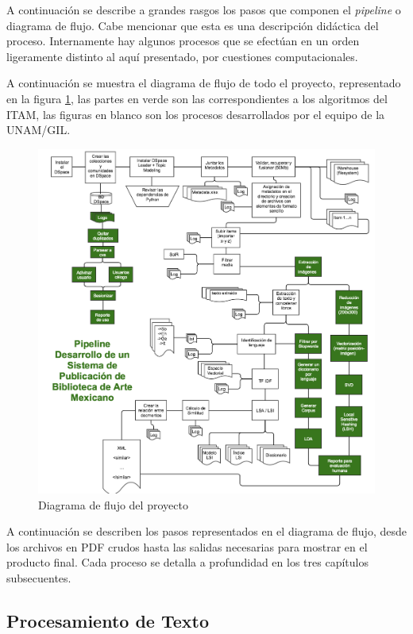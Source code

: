 A continuación se describe a grandes rasgos los pasos que componen el  \emph{pipeline} o diagrama de flujo. Cabe mencionar que esta es una descripción didáctica del proceso. Internamente hay algunos procesos que se efectúan en un orden ligeramente distinto al aquí presentado, por cuestiones computacionales.

 A continuación se muestra el diagrama de flujo de todo el proyecto, representado en la figura \ref{flujo}, las partes en verde son las correspondientes a los algoritmos  del ITAM, las figuras en blanco son los procesos desarrollados por el equipo de la UNAM/GIL.

\begin{figure}[H]
\centering
\includegraphics[width=1\textwidth]{Figures/pipeline.png}
\caption{Diagrama de flujo del proyecto}
\label{flujo}
\end{figure}

A continuación se describen  los pasos representados en el diagrama de flujo, desde los archivos en PDF crudos hasta las salidas necesarias para mostrar en el producto final. Cada proceso se detalla a profundidad en los tres capítulos subsecuentes.  

\subsection{Procesamiento de Texto} 
